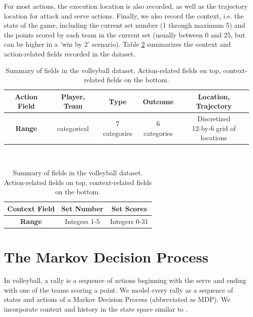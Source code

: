 \documentclass{sfuthesis}
\begin{document}
	For most actions, the execution location is also recorded, as well as the trajectory location for attack and serve actions. Finally, we also record the context, i.e. the state of the game, including the current set number (1 through maximum 5) and the points scored by each team in the current set (usually between 0 and 25, but can be higher in a 'win by 2' scenario). Table \ref{tab:data-fields} summarizes the context and action-related fields recorded in the dataset.
	\begin{table}[ht]
		\centering
		\begin{tabular}{c|c|c|c|c}
			\textbf{Action Field} & \textbf{Player, Team} & \textbf{Type} & \textbf{Outcome} & \textbf{Location, Trajectory}         \\ \hline
			\textbf{Range} & categorical           & 7 categories  & 6 categories     & \makecell[c]{Discretized\\ 12-by-6 grid of locations}
		\end{tabular}
		\\ \vspace{0.75cm}
		\begin{tabular}{c|c|c}
			\textbf{Context Field} & \textbf{Set Number} & \textbf{Set Scores}    \\ \hline
			\textbf{Range} & Integers 1-5        & Integers 0-31
		\end{tabular}
		\caption{Summary of fields in the volleyball dataset. Action-related fields on top, context-related fields on the bottom.}
		\label{tab:data-fields}
	\end{table}
	
	\section{The Markov Decision Process}
	\label{section-mdp}
	
	In volleyball, a rally is a sequence of actions beginning with the serve and ending with one of the teams scoring a point. We model every rally as a sequence of states and actions of a Markov Decision Process (abbreviated as MDP). We incorporate context and history in the state space similar to \cite{schulte2017markov}.
	
\end{document}
